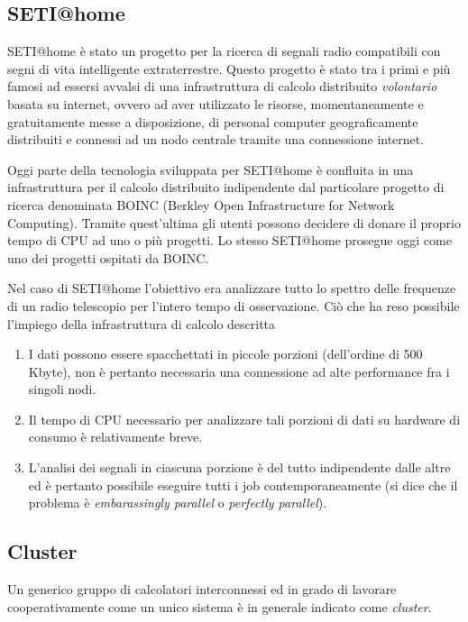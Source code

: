 \documentclass[italian,]{article}
\providecommand{\tightlist}{%
  \setlength{\itemsep}{0pt}\setlength{\parskip}{0pt}}
\begin{document}
\subsection{SETI@home}\label{setihome}

SETI@home è stato un progetto per la ricerca di segnali radio
compatibili con segni di vita intelligente extraterrestre. Questo
progetto è stato tra i primi e più famosi ad essersi avvalsi di una
infrastruttura di calcolo distribuito \emph{volontario} basata su
internet, ovvero ad aver utilizzato le risorse, momentaneamente e
gratuitamente messe a disposizione, di personal computer geograficamente
distribuiti e connessi ad un nodo centrale tramite una connessione
internet.

Oggi parte della tecnologia sviluppata per SETI@home è confluita in una
infrastruttura per il calcolo distribuito indipendente dal particolare
progetto di ricerca denominata BOINC (Berkley Open Infrastructure for
Network Computing). Tramite quest'ultima gli utenti possono decidere di
donare il proprio tempo di CPU ad uno o più progetti. Lo stesso
SETI@home prosegue oggi come uno dei progetti ospitati da BOINC.

Nel caso di SETI@home l'obiettivo era analizzare tutto lo spettro delle
frequenze di un radio telescopio per l'intero tempo di osservazione. Ciò
che ha reso possibile l'impiego della infrastruttura di calcolo
descritta

\begin{enumerate}
\def\labelenumi{\arabic{enumi}.}
\tightlist
\item
  I dati possono essere spacchettati in piccole porzioni (dell'ordine di
  500 Kbyte), non è pertanto necessaria una connessione ad alte
  performance fra i singoli nodi.
\item
  Il tempo di CPU necessario per analizzare tali porzioni di dati su
  hardware di consumo è relativamente breve.
\item
  L'analisi dei segnali in ciascuna porzione è del tutto indipendente
  dalle altre ed è pertanto possibile eseguire tutti i job
  contemporaneamente (si dice che il problema è \emph{embarassingly
  parallel} o \emph{perfectly parallel}).
\end{enumerate}

\subsection{Cluster}\label{cluster}

Un generico gruppo di calcolatori interconnessi ed in grado di lavorare
cooperativamente come un unico sistema è in generale indicato come
\emph{cluster}.
\end{document}
